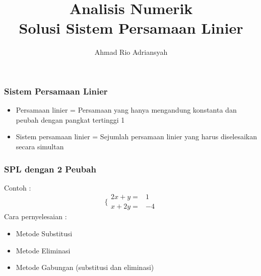 \documentclass{beamer}
\title[Anum - SPL]{Analisis Numerik\\Solusi Sistem Persamaan Linier} %
\author{Ahmad Rio Adriansyah} %
\institute[STTT-NF] %
{
STT Terpadu - Nurul Fikri \\ %
\medskip
\textit{ahmad.rio.adriansyah@gmail.com\\arasy@nurulfikri.ac.id} %
}
\date{} %
\begin{document}
\begin{frame}
\titlepage %
\end{frame}



\begin{frame}
\frametitle{Sistem Persamaan Linier}
\begin{itemize}
\item Persamaan linier = Persamaan yang hanya mengandung konstanta dan peubah dengan pangkat tertinggi 1
\item Sistem persamaan linier = Sejumlah persamaan linier yang harus diselesaikan secara simultan
\end{itemize}
\end{frame}


\begin{frame}
\frametitle{SPL dengan 2 Peubah}
Contoh : 
\begin{equation}
\Biggl\{ \begin{matrix}2x+y=&1\\x+2y=&-4\end{matrix}
\nonumber
\end{equation}
Cara pernyelesaian :
\begin{itemize}
\item Metode Substitusi
\item Metode Eliminasi
\item Metode Gabungan (substitusi dan eliminasi)
\end{itemize}
\end{frame}

\end{document}
